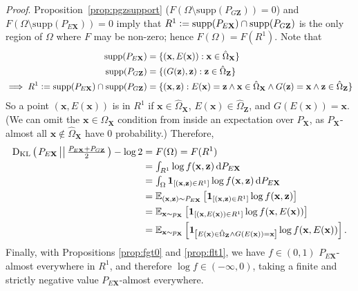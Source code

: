 \documentclass{article}
\newcommand{\proof}{\textit{Proof}.\xspace}
\newcommand{\expect}[2]{\mathbb{E}_{#1}\left[#2\right]}
\newcommand{\ldeltafunc}[1]{\mathbf{1}_{\left[#1\right]}}
\newcommand{\kld}[2]{\mathrm{D_{KL}}\left(\left.#1\,\middle|\middle|\,#2\right.\right)}
\newcommand{\defeq}{\vcentcolon=}
\renewcommand{\d}{\mathop{}\!\mathrm{d}}
\def\smallint{\begingroup\textstyle \int\endgroup}
\renewcommand{\vec}[1]{\mathbf{#1}}
\newcommand{\x}{\vec{x}}
\newcommand{\X}{\vec{X}}
\newcommand{\hOX}{\hat{\Omega}_\X}
\newcommand{\z}{\vec{z}}
\newcommand{\Z}{\vec{Z}}
\newcommand{\hOZ}{\hat{\Omega}_\Z}
\DeclareMathOperator*{\supp}{supp}
\begin{document}
\begin{appendices}
\lzeroautoenc*
\proof
Proposition~\ref{prop:pgzsupport}
($F(\Omega \setminus \mathrm{supp}(P_{G\Z})) = 0$)
and 
$ F(\Omega \setminus \mathrm{supp}(P_{E\X})) = 0 $
imply that $
R^1 \defeq
\mathrm{supp}(P_{E\X}) \cap \mathrm{supp}(P_{G\Z})
$ is the only region of $\Omega$ where $F$ may be non-zero; hence $F(\Omega) = F(R^1)$.
Note that
\begin{align*}
\supp(P_{E\X}) &=
\{ (\x,E(\x)) : \x \in \hOX \}
\\
\supp(P_{G\Z}) &=
\{ (G(\z),\z) : \z \in \hOZ \} \\
\implies R^1 \defeq
\supp(P_{E\X}) \cap \supp(P_{G\Z}) &=
\{
(\x,\z) :
E(\x) = \z \land
\x \in \hOX \land
G(\z) = \x \land
\z \in \hOZ
\}
\end{align*}
So a point $(\x, E(\x))$ is in $R^1$ if $\x \in \hOX$, $E(\x) \in \hOZ$, and $G(E(\x))=\x$.
(We can omit the $\x \in \hOX$ condition from inside an expectation over $P_\X$, as $P_\X$-almost all $\x \notin \hOX$ have 0 probability.)
Therefore,
\begin{align*}
  \kld{P_{E\X}}{\tfrac{P_{E\X}+P_{G\Z}}{2}}
  - \log 2
  &= F(\Omega) = F(R^1) \\
  &= \smallint_{R^1} \log f(\x, \z) \d P_{E\X} \\
  &= \smallint_{\Omega} \ldeltafunc{(\x, \z) \in R^1} \log f(\x, \z) \d P_{E\X} \\
  &= \expect{(\x, \z) \sim P_{E\X}}{\ldeltafunc{(\x, \z) \in R^1} \log f(\x, \z)} \\
  &= \expect{\x \sim p_\X}{\ldeltafunc{(\x, E(\x)) \in R^1} \log f(\x, E(\x))} \\
  &= \expect{\x \sim p_\X}{
    \ldeltafunc{E(\x) \in \hOZ \land G(E(\x))=\x} \log f(\x, E(\x))
  }.
\end{align*}
Finally, with Propositions \ref{prop:fgt0} and \ref{prop:flt1},
we have $f \in (0, 1)$ $P_{E\X}$-almost everywhere in $R^1$,
and therefore
$\log f \in (-\infty, 0)$, taking a finite and strictly negative value $P_{E\X}$-almost everywhere.


\end{appendices}
\end{document}
